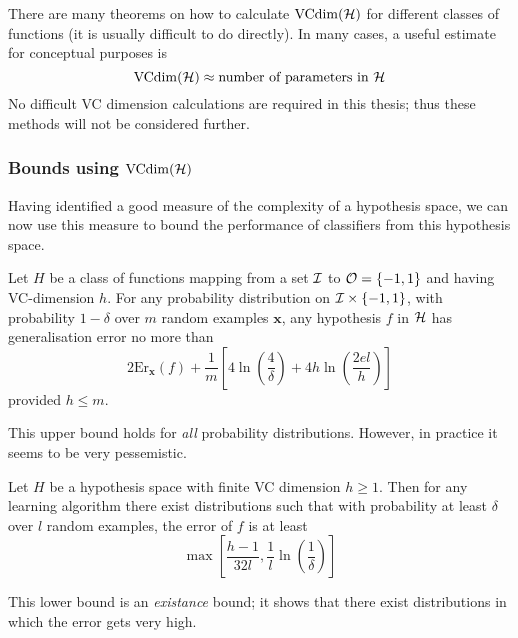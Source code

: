 There are many theorems on how to calculate $\mathrm{VCdim}(\mathcal{H})$ for
different classes of functions (it is usually difficult to do
directly).  In many cases, a useful estimate for conceptual purposes
is
%
\begin{equation}
\mathrm{VCdim}(\mathcal{H}) \approx \mbox{number of parameters in $\mathcal{H}$}
\end{equation}
%
No difficult VC dimension calculations are required in this thesis;
thus these methods will not be considered further.


\subsubsection{Bounds using $\mathrm{VCdim}(\mathcal{H})$}

Having identified a good measure of the complexity of a hypothesis
space, we can now use this measure to bound the performance of
classifiers from this hypothesis space.

\begin{theorem}
Let $H$ be a class of functions mapping from a set $\mathcal{I}$ to $\mathcal{O} =
\{-1, 1\}$ and having VC-dimension $h$.  For any probability
distribution on $\mathcal{I} \times \{-1,1\}$, with probability $1-\delta$
over $m$ random examples $\mathbf{x}$, any hypothesis $f$ in $\mathcal{H}$
has generalisation error no more than
\begin{equation}
2\mathrm{Er}_{\mathbf{x}}(f) + \frac{1}{m} \left[ 4 \ln 
\left( \frac{4}{\delta} \right) + 4 h \ln \left( \frac{2 e l}{h}
\right) \right]
\end{equation}
provided $h \leq m$.
\end{theorem}

This upper bound holds for \emph{all} probability distributions.
However, in practice it seems to be very pessemistic.

\begin{theorem}
Let $H$ be a hypothesis space with finite VC dimension $h \geq 1$.
Then for any learning algorithm there exist distributions such that
with probability at least $\delta$ over $l$ random examples, the error
of $f$ is at least
\begin{equation}
\max \left[ \frac{h-1}{32l}, \frac{1}{l} \ln \left( \frac{1}{\delta}
\right) \right]
\end{equation}
\end{theorem}

This lower bound is an \emph{existance} bound; it shows that there
exist distributions in which the error gets very high.


